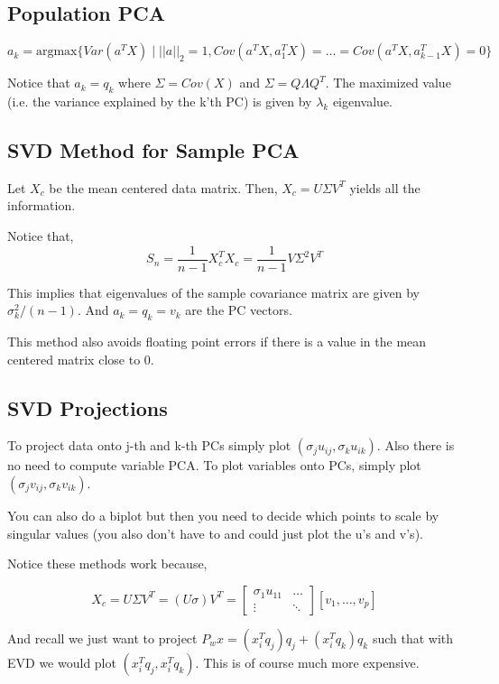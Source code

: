 \documentclass[twoside]{article}
\newcommand\argmax[1]{\text{argmax}#1}
\begin{document}
\subsection{Population PCA}
\begin{equation}
a_k = \argmax\{Var(a^TX) \;|\; ||a||_2 = 1, Cov(a^TX,a_1^TX)=\dots=Cov(a^TX,a_{k-1}^TX)=0\}
\end{equation}

Notice that $a_k = q_k$ where $\Sigma = Cov(X)$ and $\Sigma = Q\Lambda Q^T$. The maximized value (i.e. the variance explained by the k'th PC) is given by $\lambda_k$ eigenvalue.

\subsection{SVD Method for Sample PCA} 

Let $X_c$ be the mean centered data matrix. Then, $X_c = U\Sigma V^T$ yields all the information.

Notice that, $$S_n = \frac{1}{n-1}X_c^TX_c = \frac{1}{n-1}V\Sigma^2 V^T$$

This implies that eigenvalues of the sample covariance matrix are given by $\sigma_k^2/(n-1)$. And $a_k = q_k = v_k$ are the PC vectors.

This method also avoids floating point errors if there is a value in the mean centered matrix close to 0.

\subsection{SVD Projections}
To project data onto j-th and k-th PCs simply plot $(\sigma_ju_{ij}, \sigma_ku_{ik})$. Also there is no need to compute variable PCA. To plot variables onto PCs, simply plot $(\sigma_jv_{ij}, \sigma_kv_{ik})$.

You can also do a biplot but then you need to decide which points to scale by singular values (you also don't have to and could just plot the u's and v's).

Notice these methods work because,

$$X_c = U\Sigma V^T = (U\sigma) V^T = \begin{bmatrix}\sigma_1 u_{11}&\dots\\\vdots&\ddots\end{bmatrix}[v_1,\dots,v_p]$$

And recall we just want to project $P_wx = (x_i^Tq_j)q_j + (x_i^Tq_k)q_k$ such that with EVD we would plot $(x_i^Tq_j, x_i^Tq_k)$. This is of course much more expensive.
\end{document}
